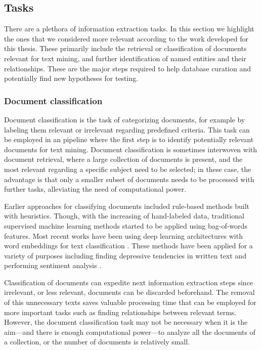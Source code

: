 \subsection{Tasks}

There are a plethora of information extraction tasks.
In this section we highlight the ones that we considered more relevant according to the work developed for this thesis.
These primarily include the retrieval or classification of documents relevant for text mining, and further identification of named entities and their relationships.
These are the major steps required to help database curation and potentially find new hypotheses for testing.


\subsubsection{Document classification}

Document classification is the task of categorizing documents, for example by labeling them relevant or irrelevant regarding predefined criteria.
This task can be employed in an  pipeline where the first step is to identify potentially relevant documents for text mining.
Document classification is sometimes interwoven with document retrieval, where a large collection of documents is present, and the most relevant regarding a specific subject need to be selected; in these case, the advantage is that only a smaller subset of documents needs to be processed with further  tasks, alleviating the need of computational power.


Earlier approaches for classifying documents included rule-based methods built with heuristics.
Though, with the increasing of hand-labeled data, traditional supervised machine learning methods started to be applied using bag-of-words features.
Most recent works have been using deep learning architectures with word embeddings for text classification \parencite{yang2016a,fergadis2018a}.
These methods have been applied for a variety of purposes including finding depressive tendencies in written text \parencite{yates2017a} and performing sentiment analysis \parencite{cambria2013a}.

Classification of documents can expedite next information extraction steps since irrelevant, or less relevant, documents can be discarded beforehand.
The removal of this unnecessary texts saves valuable processing time that can be employed for more important tasks such as finding relationships between relevant terms.
However, the document classification task may not be necessary when it is the aim---and there is enough computational power---to analyze all the documents of a collection, or the number of documents is relatively small.


